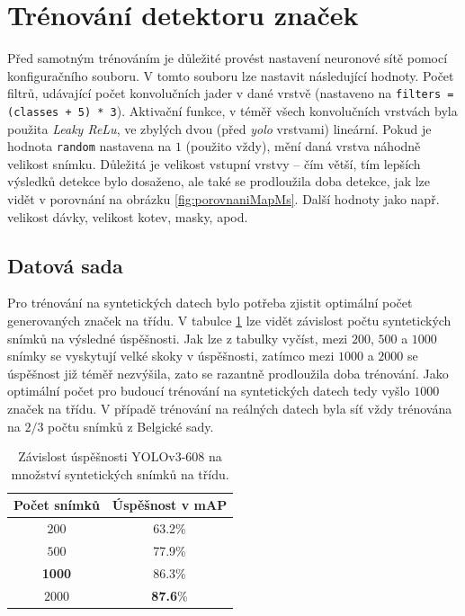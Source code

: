\documentclass[czech]{ExcelAtFIT} %
\begin{document}

\section{Trénování detektoru značek}
Před samotným trénováním je důležité provést nastavení neuronové sítě pomocí konfiguračního souboru. V tomto souboru lze nastavit následující hodnoty. Počet filtrů, udávající počet konvolučních jader v dané vrstvě (nastaveno na \texttt{filters = (classes + 5) * 3}). Aktivační funkce, v téměř všech konvolučních vrstvách byla použita \emph{Leaky ReLu}, ve zbylých dvou (před \emph{yolo} vrstvami) lineární. Pokud je hodnota \texttt{random} nastavena na $1$ (použito vždy), mění daná vrstva náhodně velikost snímku. Důležitá je velikost vstupní vrstvy -- čím větší, tím lepších výsledků detekce bylo dosaženo, ale také se prodloužila doba detekce, jak lze vidět v porovnání na obrázku \ref{fig:porovnaniMapMs}. Další hodnoty jako např. velikost dávky, velikost kotev, masky, apod.

\subsection{Datová sada}
Pro trénování na syntetických datech bylo potřeba zjistit optimální počet generovaných značek na třídu. V tabulce \ref{tab:pocetSnimkuUspesnost} lze vidět závislost počtu syntetických snímků na výsledné úspěšnosti. Jak lze z tabulky vyčíst, mezi $200$, $500$ a $1000$ snímky se vyskytují velké skoky v úspěšnosti, zatímco mezi $1000$ a $2000$ se úspěšnost již téměř nezvýšila, zato se razantně prodloužila doba trénování. Jako optimální počet pro budoucí trénování na syntetických datech tedy vyšlo $1000$ značek na třídu. V případě trénování na reálných datech byla síť vždy trénována na $2/3$ počtu snímků z Belgické sady.

\begin{table}[h]
	\vskip6pt
	\caption{Závislost úspěšnosti YOLOv3-608 na množství syntetických snímků na třídu.}
	\centering
	\begin{tabular}{cc}
		\toprule
		Počet snímků & Úspěšnost v mAP\\
		\midrule
		$200$  & 63.2\% \\
		$500$  & 77.9\% \\
		\textbf{1000} & 86.3\% \\
		$2000$ & \textbf{87.6}\% \\
		\bottomrule
	\end{tabular}
	\label{tab:pocetSnimkuUspesnost}
\end{table}
\end{document}
